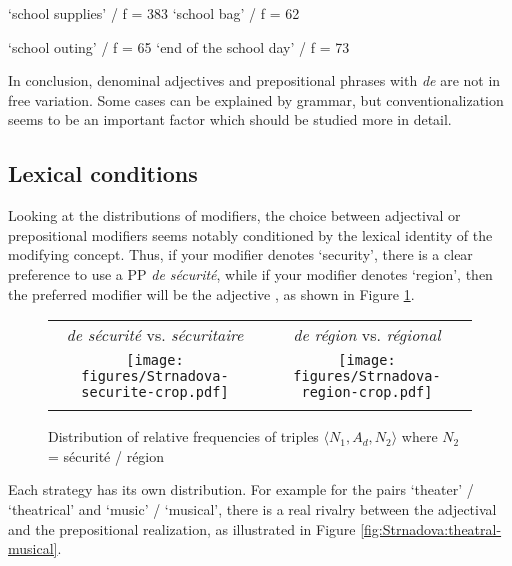 \documentclass[output=paper]{LSP/langsci}
\begin{document}
\begin{exe}
\ex \label{ex:Strnadova:N1scolaire} \begin{xlist}
 `school supplies' / f = 383
 `school bag'  / f = 62
\end{xlist}
\end{exe}

\begin{exe}
\ex \label{ex:Strnadova:sortieN2} \begin{xlist}
 `school outing' / f = 65
 `end of the school day' / f = 73
\end{xlist}
\end{exe}

In conclusion, denominal adjectives and prepositional phrases with \emph{de} are not in free variation. Some cases can be explained by grammar, but conventionalization seems to be an important factor which should be studied more in detail.

\subsection{Lexical conditions}

Looking at the distributions of modifiers, the choice between adjectival or prepositional modifiers seems notably conditioned by the lexical identity of the modifying concept. Thus, if your modifier denotes `security', there is a clear preference to use a PP  \emph{de  sécurité}, while if your modifier denotes `region', then the preferred modifier will be the adjective , as shown in Figure \ref{fig:Strnadova:securitaire-regional}.

\begin{figure}
\centering\small
\begin{tabular}{cc}
\emph{de sécurité} vs. \emph{sécuritaire} 
&
\emph{de région} vs. \emph{régional}\\
\texttt{[image: figures/Strnadova-securite-crop.pdf]}
&
\texttt{[image: figures/Strnadova-region-crop.pdf]}\\ \\
\end{tabular}
\caption{ Distribution of relative frequencies of triples $\langle N_1,A_d,N_2\rangle$ where $N_2$  = sécurité / région}
\label{fig:Strnadova:securitaire-regional}
\end{figure}

Each strategy has its own distribution. For example for the pairs  `theater' /  `theatrical' and   `music' /  `musical', there is a real rivalry between the adjectival and the prepositional realization, as illustrated in Figure \ref{fig:Strnadova:theatral-musical}.
\end{document}
